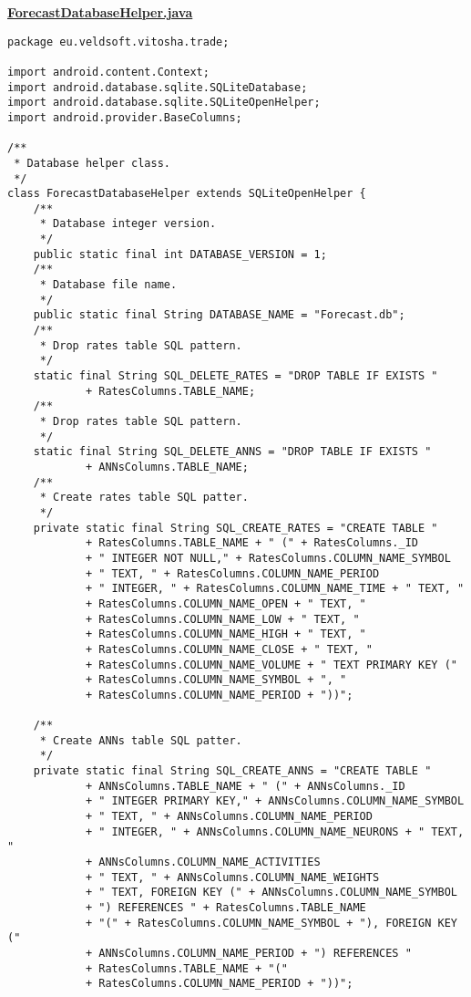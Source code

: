 \textbf{\underline{ForecastDatabaseHelper.java}}
\begin{verbatim}
package eu.veldsoft.vitosha.trade;

import android.content.Context;
import android.database.sqlite.SQLiteDatabase;
import android.database.sqlite.SQLiteOpenHelper;
import android.provider.BaseColumns;

/**
 * Database helper class.
 */
class ForecastDatabaseHelper extends SQLiteOpenHelper {
    /**
     * Database integer version.
     */
    public static final int DATABASE_VERSION = 1;
    /**
     * Database file name.
     */
    public static final String DATABASE_NAME = "Forecast.db";
    /**
     * Drop rates table SQL pattern.
     */
    static final String SQL_DELETE_RATES = "DROP TABLE IF EXISTS "
            + RatesColumns.TABLE_NAME;
    /**
     * Drop rates table SQL pattern.
     */
    static final String SQL_DELETE_ANNS = "DROP TABLE IF EXISTS "
            + ANNsColumns.TABLE_NAME;
    /**
     * Create rates table SQL patter.
     */
    private static final String SQL_CREATE_RATES = "CREATE TABLE "
            + RatesColumns.TABLE_NAME + " (" + RatesColumns._ID
            + " INTEGER NOT NULL," + RatesColumns.COLUMN_NAME_SYMBOL
            + " TEXT, " + RatesColumns.COLUMN_NAME_PERIOD
            + " INTEGER, " + RatesColumns.COLUMN_NAME_TIME + " TEXT, "
            + RatesColumns.COLUMN_NAME_OPEN + " TEXT, "
            + RatesColumns.COLUMN_NAME_LOW + " TEXT, "
            + RatesColumns.COLUMN_NAME_HIGH + " TEXT, "
            + RatesColumns.COLUMN_NAME_CLOSE + " TEXT, "
            + RatesColumns.COLUMN_NAME_VOLUME + " TEXT PRIMARY KEY ("
            + RatesColumns.COLUMN_NAME_SYMBOL + ", "
            + RatesColumns.COLUMN_NAME_PERIOD + "))";

    /**
     * Create ANNs table SQL patter.
     */
    private static final String SQL_CREATE_ANNS = "CREATE TABLE "
            + ANNsColumns.TABLE_NAME + " (" + ANNsColumns._ID
            + " INTEGER PRIMARY KEY," + ANNsColumns.COLUMN_NAME_SYMBOL
            + " TEXT, " + ANNsColumns.COLUMN_NAME_PERIOD
            + " INTEGER, " + ANNsColumns.COLUMN_NAME_NEURONS + " TEXT, "
            + ANNsColumns.COLUMN_NAME_ACTIVITIES
            + " TEXT, " + ANNsColumns.COLUMN_NAME_WEIGHTS
            + " TEXT, FOREIGN KEY (" + ANNsColumns.COLUMN_NAME_SYMBOL
            + ") REFERENCES " + RatesColumns.TABLE_NAME
            + "(" + RatesColumns.COLUMN_NAME_SYMBOL + "), FOREIGN KEY ("
            + ANNsColumns.COLUMN_NAME_PERIOD + ") REFERENCES "
            + RatesColumns.TABLE_NAME + "("
            + RatesColumns.COLUMN_NAME_PERIOD + "))";


\end{verbatim}
